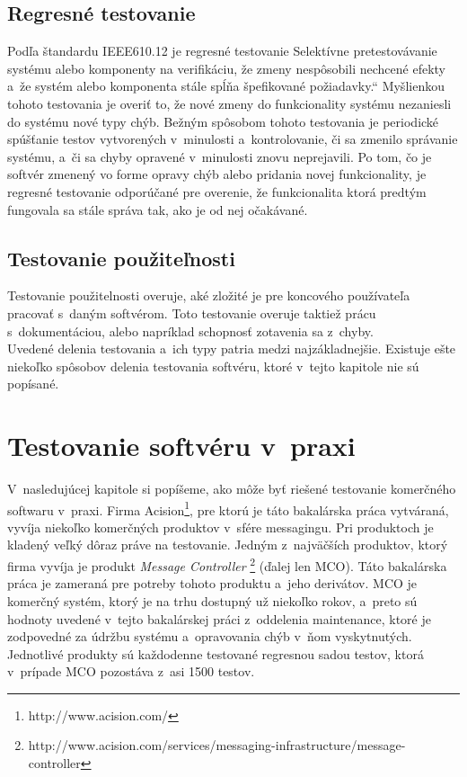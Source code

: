 \subsection*{Regresné testovanie} \label{sekcia:regresne_testovanie}
Podľa štandardu IEEE610.12 \cite{Ieee_glossary} je regresné testovanie \quotedblbase Selektívne pretestovávanie 
systému alebo komponenty na verifikáciu, že zmeny nespôsobili nechcené efekty a~že systém alebo
komponenta stále spĺňa špefikované požiadavky.\textquotedblleft
Myšlienkou tohoto testovania je overiť to, že nové zmeny do funkcionality systému nezaniesli do systému nové typy chýb.
Bežným spôsobom tohoto testovania je periodické spúšťanie testov vytvorených v~minulosti a~kontrolovanie, či sa zmenilo správanie
systému, a~či sa chyby opravené v~minulosti znovu neprejavili. Po tom, čo je softvér zmenený vo forme opravy chýb alebo
pridania novej funkcionality, je regresné testovanie odporúčané pre overenie, že funkcionalita ktorá predtým fungovala sa stále správa tak, 
ako je od nej očakávané.
\subsection*{Testovanie použiteľnosti}
Testovanie použitelnosti overuje, aké zložité je pre koncového používateľa pracovať s~daným softvérom.
Toto testovanie overuje taktiež prácu s~dokumentáciou, alebo napríklad schopnosť zotavenia sa z~chyby. 
\\

Uvedené delenia testovania a~ich typy patria medzi najzákladnejšie. 
Existuje ešte niekoľko spôsobov delenia testovania softvéru, ktoré v~tejto kapitole nie sú popísané.



\section{Testovanie softvéru v~praxi} 
\label{sekcia:testovanie_v_praxi}

V~nasledujúcej kapitole si popíšeme, ako môže byť riešené testovanie komerčného softwaru v~praxi.
Firma Acision\footnote{http://www.acision.com/}, pre ktorú je táto bakalárska práca vytváraná, vyvíja niekoľko komerčných produktov
v~sfére messagingu. Pri produktoch je kladený veľký dôraz práve na testovanie.
Jedným z~najväčších produktov, ktorý firma vyvíja je produkt {\it Message Controller}
\footnote{http://www.acision.com/services/messaging-infrastructure/message-controller} (ďalej len MCO).
Táto bakalárska práca je zameraná pre potreby tohoto produktu a~jeho derivátov.
MCO je komerčný systém, ktorý je na trhu dostupný už niekoľko rokov, a~preto sú hodnoty uvedené v~tejto 
bakalárskej práci z~oddelenia maintenance, ktoré je zodpovedné za údržbu systému a~opravovania chýb v~ňom vyskytnutých.
Jednotlivé produkty sú každodenne testované regresnou sadou testov, ktorá v~prípade MCO pozostáva z~asi 1500 testov.


